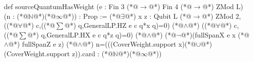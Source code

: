 def sourceQuantumHasWeight (e : Fin 3 (*@$\to$@*) Fin 4 (*@$\to$@*) ZMod L) (n : (*@$\mathbb N$@*)(*@$\infty$@*)) : Prop :=
  (*@$\exists$@*) x z : Qubit L (*@$\to$@*) ZMod 2,
    ((*@$\forall$@*) c,((*@$\sum$@*) q,GeneralLP.HZ e c q*x q)=0) (*@$\land$@*)
    ((*@$\forall$@*) c,((*@$\sum$@*) q,GeneralLP.HX e c q*z q)=0) (*@$\land$@*)
    (*@$\neg$@*)(fullSpanX e x (*@$\land$@*) fullSpanZ e z) (*@$\land$@*)
    n=(((CoverWeight.support x)(*@$\cup$@*)(CoverWeight.support z)).card : (*@$\mathbb N$@*)(*@$\infty$@*))
